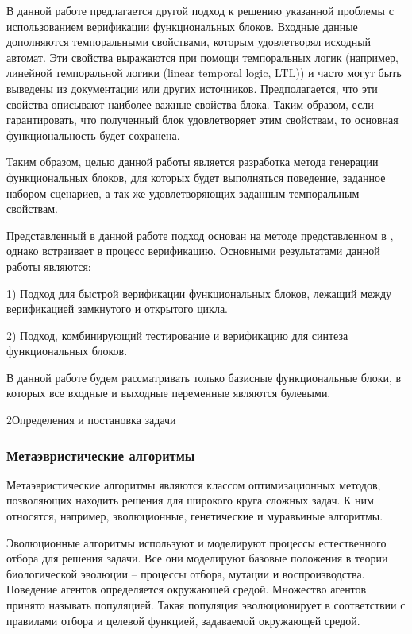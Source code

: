 \documentclass[14pt]{extarticle}
\makeatletter
\theoremstyle{plain}
\theoremstyle{definition}
\renewcommand{\subsection}{\@startsection{subsection}{2}{0mm}%
{2\baselineskip}{\baselineskip}{\bfseries\large\itshape}}
\makeatother
\begin{document}
В данной работе предлагается другой подход к решению указанной проблемы с использованием верификации
функциональных блоков. Входные данные дополняются темпоральными свойствами,
которым удовлетворял исходный автомат. Эти свойства выражаются при помощи
темпоральных логик (например, линейной темпоральной логики (linear temporal logic, LTL)) и часто могут быть
выведены из документации или других источников. Предполагается, что эти
свойства описывают наиболее важные свойства блока. Таким образом, если 
гарантировать, что полученный блок удовлетворяет этим свойствам, то
основная функциональность будет сохранена.

Таким образом, целью данной работы является разработка метода генерации
функциональных блоков, для которых будет выполняться поведение, заданное
набором сценариев, а так же удовлетворяющих заданным темпоральным свойствам.

Представленный в данной работе подход основан на методе представленном в \cite{rec},
однако встраивает в процесс верификацию. Основными результатами данной работы
являются:

1) Подход для быстрой верификации функциональных блоков, лежащий между
верификацией замкнутого и открытого цикла.

2) Подход, комбинирующий тестирование и верификацию для синтеза функциональных
блоков.

В данной работе будем рассматривать только базисные функциональные блоки, в которых
все входные и выходные переменные являются булевыми.

\pagebreak

\subsection{Определения и постановка задачи}

\subsubsection{Метаэвристические алгоритмы}

Метаэвристические алгоритмы являются классом оптимизационных методов,
позволяющих находить решения для широкого круга сложных задач. К ним относятся, например,
эволюционные, генетические и муравьиные алгоритмы.

Эволюционные алгоритмы используют и моделируют процессы естественного отбора
для решения задачи. Все они моделируют базовые положения в теории биологической
эволюции -- процессы отбора, мутации и воспроизводства. Поведение агентов
определяется окружающей средой. Множество агентов принято называть популяцией.
Такая популяция эволюционирует в соответствии с правилами отбора и целевой функцией, задаваемой окружающей средой.
\end{document}
